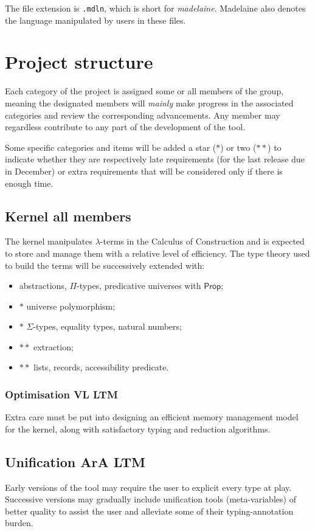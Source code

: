 \documentclass[twocolumn]{article}
\begin{document}
The file extension is \texttt{.mdln}, which is short for \emph{madelaine}.
Madelaine also denotes the language manipulated by users in these files.

\section{Project structure}
Each category of the project is assigned some or all members of the group,
meaning the designated members will \emph{mainly} make progress in the associated categories
and review the corresponding advancements. Any member may regardless contribute to any part
of the development of the tool.

Some specific categories and items will be added a star (\(*\)) or two (\(**\)) to
indicate whether they are respectively late requirements (for the last release
due in December)
or extra requirements that will be considered only if there is enough time.


\subsection{Kernel  \hfill\scriptsize all members}
The kernel manipulates \(\lambda\)-terms in the Calculus of Construction and is
expected to store and manage them with a relative level of efficiency.
The type theory used to build the terms will be successively extended with:
\begin{itemize}
  \item abstractions, \(\Pi\)-types, predicative universes with \(\mathsf{Prop}\);
  \item \(*\) universe polymorphism;
  \item \(*\) \(\Sigma\)-types, equality types, natural numbers;
  \item \(**\) extraction;
  \item \(**\) lists, records, accessibility predicate.
\end{itemize}

\subsubsection{Optimisation \hfill\scriptsize VL LTM}
Extra care must be put into designing an efficient memory management model for
the kernel, along with satisfactory typing and reduction algorithms.


\subsection{Unification \hfill\scriptsize ArA LTM}
Early versions of the tool may require the user to explicit every type at play.
Successive versions may gradually include unification tools (meta-variables)
of better quality to assist the user and alleviate some of their typing-annotation
burden.
\end{document}
